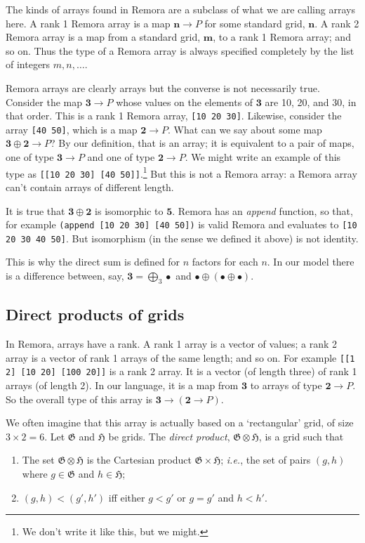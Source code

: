 \documentclass[11pt]{article}
\newcommand{\gr}[1]{\mathfrak{#1}}
\newcommand{\unit}{\bullet}
\newcommand{\two}{\mathbf{2}}
\newcommand{\three}{\mathbf{3}}
\begin{document}
The kinds of arrays found in Remora are a subclass of what we are calling arrays
here. A rank 1 Remora array is a map \(\mathbf{n}\to P\) for some standard grid,
\(\mathbf{n}\). A rank 2 Remora array is a map from a standard grid,
\(\mathbf{m}\), to a rank 1 Remora array; and so on. Thus the type of a Remora
array is always specified completely by the list of integers \(m, n, \dotsc\).

Remora arrays are clearly arrays but the converse is not necessarily
true. Consider the map \(\mathbf{3}\to P\) whose values on the elements of
\(\mathbf{3}\) are 10, 20, and 30, in that order. This is a rank 1 Remora array,
\verb|[10 20 30]|. Likewise, consider the array \verb|[40 50]|, which is a map
\(\mathbf{2}\to P\). What can we say about some map \(\mathbf{3}\oplus\mathbf{2}\to P\)?
By our definition, that is an array; it is equivalent to a pair of maps, one of
type \(\mathbf{3}\to P\) and one of type \(\mathbf{2}\to P\). We might write an
example of this type as \texttt{[[10 20 30] [40 50]]}.\footnote{We don't write
it like this, but we might.} But this is not a Remora array: a Remora array
can't contain arrays of different length.

It is true that \(\mathbf{3}\oplus\mathbf{2}\) is isomorphic to \(\mathbf{5}\).
Remora has an \emph{append} function, so that, for example \texttt{(append [10
    20 30] [40 50])} is valid Remora and evaluates to \texttt{[10 20 30 40 50]}.
But isomorphism (in the sense we defined it above) is not identity.

This is why the direct sum is defined for $n$ factors for each $n$. In our model
there is a difference between, say, $\mathbf{3} = \bigoplus_3 \unit$ and $\unit
\oplus (\unit \oplus \unit)$.



\subsection{Direct products of grids}

In Remora, arrays have a rank. A rank 1 array is a vector of values; a rank 2
array is a vector of rank 1 arrays of the same length; and so on.  For example
\verb|[[1 2] [10 20] [100 20]]| is a rank 2 array. It is a vector (of length
three) of rank 1 arrays (of length 2). In our language, it is a map from $\three$
to arrays of type $\two \to P$. So the overall type of this array is $\three \to
(\two \to P)$.

We often imagine that this array is actually based on a `rectangular' grid, of
size $3 \times 2 = 6$. Let $\gr{G}$ and $\gr{H}$ be grids. The \emph{direct product},
$\gr{G}\otimes\gr{H}$, is a grid such that
\begin{enumerate}
\item The set $\gr{G}\otimes\gr{H}$ is the Cartesian product $\gr{G} \times \gr{H}$;
 \emph{i.e.}, the set of pairs $(g, h)$ where $g\in\gr{G}$ and $h\in\gr{H}$;
\item $(g, h) < (g', h')$ iff either $g < g'$ or $g = g'$ and $h < h'$. 
\end{enumerate}
\end{document}
